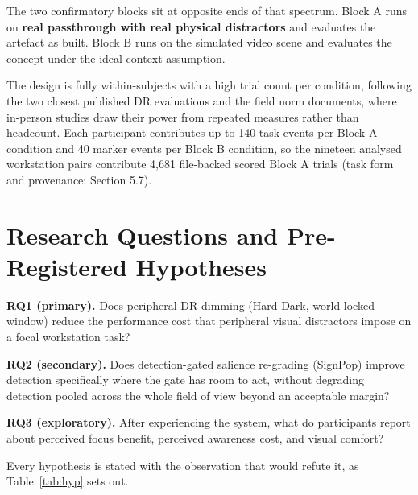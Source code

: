 The two confirmatory blocks sit at opposite ends of that spectrum. Block A runs on \textbf{real
passthrough with real physical distractors} and evaluates the artefact as built. Block B runs on the
simulated video scene and evaluates the concept under the ideal-context assumption.

The design is fully within-subjects with a high trial count per condition, following the two closest
published DR evaluations \citep{cheng2022,mclaughlin2025} and the field norm \citet{caine2016}
documents, where in-person studies draw their power from repeated measures rather than headcount.
Each participant contributes up to 140 task events per Block A condition and 40 marker events per
Block B condition, so the nineteen analysed workstation pairs contribute 4,681 file-backed scored
Block A trials (task form and provenance: Section 5.7).

\section{Research Questions and Pre-Registered Hypotheses}

\textbf{RQ1 (primary).} Does peripheral DR dimming (Hard Dark, world-locked window) reduce the
performance cost that peripheral visual distractors impose on a focal workstation task?

\textbf{RQ2 (secondary).} Does detection-gated salience re-grading (SignPop) improve detection
specifically where the gate has room to act, without degrading detection pooled across the whole
field of view beyond an acceptable margin?

\textbf{RQ3 (exploratory).} After experiencing the system, what do participants report about
perceived focus benefit, perceived awareness cost, and visual comfort?

Every hypothesis is stated with the observation that would refute it, as Table~\ref{tab:hyp} sets
out.

